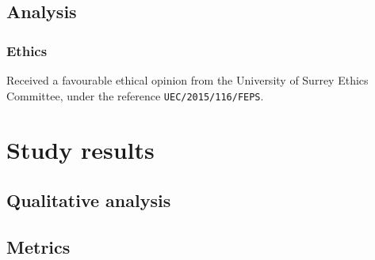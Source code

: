 \subsection{Analysis}

\subsubsection{Ethics}

Received a favourable ethical opinion from the University of Surrey Ethics Committee, under the reference \texttt{UEC/2015/116/FEPS}.

\section{Study results}

\subsection{Qualitative analysis}





\subsection{Metrics}


